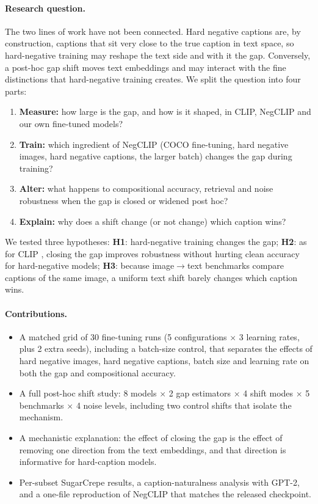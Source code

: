 \documentclass[11pt,a4paper]{article}
\begin{document}
\paragraph{Research question.}
The two lines of work have not been connected. Hard negative captions are, by construction, captions
that sit very close to the true caption in text space, so hard-negative training may reshape the text
side and with it the gap. Conversely, a post-hoc gap shift moves text embeddings and may interact with
the fine distinctions that hard-negative training creates. We split the question into four parts:
\begin{enumerate}
\item \textbf{Measure:} how large is the gap, and how is it shaped, in CLIP, NegCLIP and our own
fine-tuned models?
\item \textbf{Train:} which ingredient of NegCLIP (COCO fine-tuning, hard negative images, hard
negative captions, the larger batch) changes the gap during training?
\item \textbf{Alter:} what happens to compositional accuracy, retrieval and noise robustness when the
gap is closed or widened post hoc?
\item \textbf{Explain:} why does a shift change (or not change) which caption wins?
\end{enumerate}
We tested three hypotheses:
\textbf{H1}: hard-negative training changes the gap;
\textbf{H2}: as for CLIP \cite{chowers}, closing the gap improves robustness without hurting clean
accuracy for hard-negative models;
\textbf{H3}: because image$\to$text benchmarks compare captions of the same image, a uniform text shift
barely changes which caption wins.

\paragraph{Contributions.}
\begin{itemize}
\item A matched grid of 30 fine-tuning runs (5 configurations $\times$ 3 learning rates, plus 2 extra
seeds), including a batch-size control, that separates the effects of hard negative images, hard
negative captions, batch size and learning rate on both the gap and compositional accuracy.
\item A full post-hoc shift study: 8 models $\times$ 2 gap estimators $\times$ 4 shift modes
$\times$ 5 benchmarks $\times$ 4 noise levels, including two control shifts that isolate the mechanism.
\item A mechanistic explanation: the effect of closing the gap is the effect of removing one direction
from the text embeddings, and that direction is informative for hard-caption models.
\item Per-subset SugarCrepe results, a caption-naturalness analysis with GPT-2, and a one-file
reproduction of NegCLIP that matches the released checkpoint.
\end{itemize}
\end{document}

